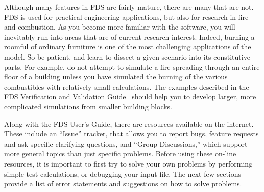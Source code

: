 \documentclass[11pt]{book}
\begin{document}
Although many features in FDS are fairly mature, there are many that are not. FDS is used for
practical engineering applications, but also for research in fire and combustion. As you become
more familiar with the software, you will inevitably run into areas that are of current research
interest. Indeed, burning a roomful of ordinary furniture is one of the most challenging applications
of the model. So be patient, and learn to dissect a given scenario into its constitutive parts.
For example, do not attempt to simulate a fire spreading through an entire floor of a
building unless you have simulated the burning of the various combustibles with relatively small calculations.
The examples described in the FDS Verification and Validation Guide~\cite{FDS_VV_Guide_5} should help
you to develop larger, more complicated simulations from smaller building blocks.

Along with the FDS User's Guide, there are resources available on the internet.
These include an ``Issue'' tracker, that allows you to report bugs, feature requests and ask specific clarifying questions,
and ``Group Discussions,'' which support more general topics than just specific problems.
Before using these on-line resources, it is important to first try to solve your own
problems by performing simple test calculations, or debugging your input file. The next few sections
provide a list of error statements and suggestions on how to solve problems.
\end{document}
